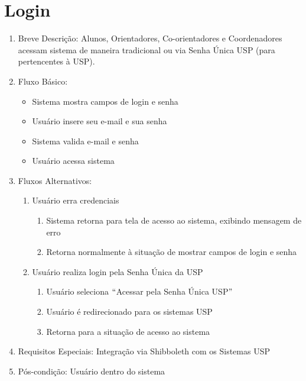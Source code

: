 \section{Login}
\begin{enumerate}
    \item Breve Descrição: Alunos, Orientadores, Co-orientadores e Coordenadores acessam sistema de maneira tradicional ou via Senha Única USP (para pertencentes à USP).
    \item Fluxo Básico:
    \begin{itemize}
        \item Sistema mostra campos de login e senha
        \item Usuário insere seu e-mail e sua senha
        \item Sistema valida e-mail e senha
        \item Usuário acessa sistema
    \end{itemize}
    \item Fluxos Alternativos:
    \begin{enumerate}
        \item Usuário erra credenciais
        \begin{enumerate}
            \item Sistema retorna para tela de acesso ao sistema, exibindo mensagem de erro
            \item Retorna normalmente à situação de mostrar campos de login e senha
        \end{enumerate}
        \item Usuário realiza login pela Senha Única da USP
        \begin{enumerate}
            \item Usuário seleciona $``$Acessar pela Senha Única USP$"$ 
            \item Usuário é redirecionado para os sistemas USP
            \item Retorna para a situação de acesso ao sistema
        \end{enumerate}
    \end{enumerate}
    \item Requisitos Especiais: Integração via Shibboleth com os Sistemas USP
    \item Pós-condição: Usuário dentro do sistema
\end{enumerate}

